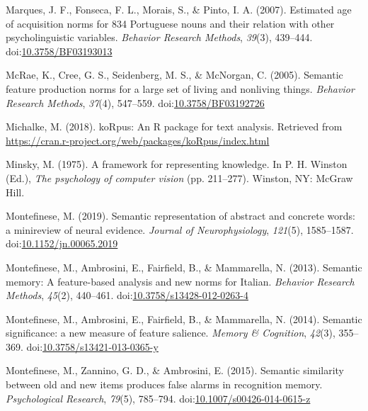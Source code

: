 \documentclass[man]{apa6}
\begin{document}
\leavevmode\hypertarget{ref-Marques2007a}{}%
Marques, J. F., Fonseca, F. L., Morais, S., \& Pinto, I. A. (2007). Estimated age of acquisition norms for 834 Portuguese nouns and their relation with other psycholinguistic variables. \emph{Behavior Research Methods}, \emph{39}(3), 439--444. doi:\href{https://doi.org/10.3758/BF03193013}{10.3758/BF03193013}

\leavevmode\hypertarget{ref-McRae2005}{}%
McRae, K., Cree, G. S., Seidenberg, M. S., \& McNorgan, C. (2005). Semantic feature production norms for a large set of living and nonliving things. \emph{Behavior Research Methods}, \emph{37}(4), 547--559. doi:\href{https://doi.org/10.3758/BF03192726}{10.3758/BF03192726}

\leavevmode\hypertarget{ref-Michalke2018}{}%
Michalke, M. (2018). koRpus: An R package for text analysis. Retrieved from \url{https://cran.r-project.org/web/packages/koRpus/index.html}

\leavevmode\hypertarget{ref-Minsky1975}{}%
Minsky, M. (1975). A framework for representing knowledge. In P. H. Winston (Ed.), \emph{The psychology of computer vision} (pp. 211--277). Winston, NY: McGraw Hill.

\leavevmode\hypertarget{ref-Montefinese2019}{}%
Montefinese, M. (2019). Semantic representation of abstract and concrete words: a minireview of neural evidence. \emph{Journal of Neurophysiology}, \emph{121}(5), 1585--1587. doi:\href{https://doi.org/10.1152/jn.00065.2019}{10.1152/jn.00065.2019}

\leavevmode\hypertarget{ref-Montefinese2013}{}%
Montefinese, M., Ambrosini, E., Fairfield, B., \& Mammarella, N. (2013). Semantic memory: A feature-based analysis and new norms for Italian. \emph{Behavior Research Methods}, \emph{45}(2), 440--461. doi:\href{https://doi.org/10.3758/s13428-012-0263-4}{10.3758/s13428-012-0263-4}

\leavevmode\hypertarget{ref-Montefinese2014}{}%
Montefinese, M., Ambrosini, E., Fairfield, B., \& Mammarella, N. (2014). Semantic significance: a new measure of feature salience. \emph{Memory \& Cognition}, \emph{42}(3), 355--369. doi:\href{https://doi.org/10.3758/s13421-013-0365-y}{10.3758/s13421-013-0365-y}

\leavevmode\hypertarget{ref-Montefinese2015}{}%
Montefinese, M., Zannino, G. D., \& Ambrosini, E. (2015). Semantic similarity between old and new items produces false alarms in recognition memory. \emph{Psychological Research}, \emph{79}(5), 785--794. doi:\href{https://doi.org/10.1007/s00426-014-0615-z}{10.1007/s00426-014-0615-z}
\end{document}
